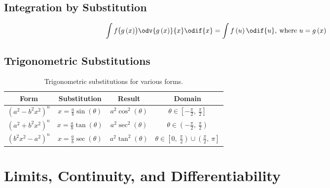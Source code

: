 \documentclass{article}
\begin{document}
\subsection{Integration by Substitution}
\begin{theorem}
    \begin{equation*}
        \int f\bigl(g\left( x \right)\bigr)\odv{g\left( x \right)}{x} \odif{x} = \int f\left( u \right) \odif{u}, \: \text{where } u = g\left( x \right)
    \end{equation*}
\end{theorem}
\subsection{Trigonometric Substitutions}
\begin{table}[H]
    \renewcommand*{\arraystretch}{1.5}
    \centering
    \begin{tabular}{c c c c}
        \toprule
        \textbf{Form}                 & \textbf{Substitution}                                      & \textbf{Result}                      & \textbf{Domain}                                                                        \\
        \midrule
        \(\left(a^2-b^2x^2\right)^n\) & \(\displaystyle x=\frac{a}{b}\sin{\left( \theta \right)}\) & \(a^2\cos^2{\left( \theta \right)}\) & \(\theta\in \left[ -\frac{\pi}{2},\: \frac{\pi}{2} \right]\)                           \\[8pt]
        \(\left(a^2+b^2x^2\right)^n\) & \(\displaystyle x=\frac{a}{b}\tan{\left( \theta \right)}\) & \(a^2\sec^2{\left( \theta \right)}\) & \(\theta\in \left( -\frac{\pi}{2},\: \frac{\pi}{2} \right)\)                           \\[8pt]
        \(\left(b^2x^2-a^2\right)^n\) & \(\displaystyle x=\frac{a}{b}\sec{\left( \theta \right)}\) & \(a^2\tan^2{\left( \theta \right)}\) & \(\theta\in \left[ 0,\: \frac{\pi}{2} \right) \cup \left(\frac{\pi}{2},\: \pi\right]\) \\ %
        \bottomrule
    \end{tabular}
    \caption{Trigonometric substitutions for various forms.}
\end{table}
\newpage
\section{Limits, Continuity, and Differentiability}
\end{document}
